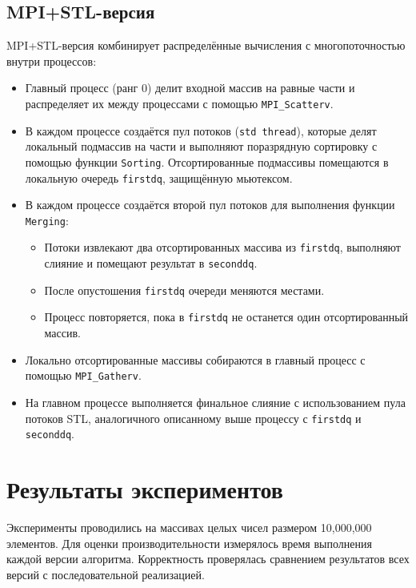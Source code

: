 \documentclass[a4paper,12pt]{article}
\begin{document}
\subsection{MPI+STL-версия}
MPI+STL-версия комбинирует распределённые вычисления с многопоточностью внутри процессов:
\begin{itemize}
    \item Главный процесс (ранг 0) делит входной массив на равные части и распределяет их между процессами с помощью \texttt{MPI_Scatterv}.
    \item В каждом процессе создаётся пул потоков (\texttt{std thread}), которые делят локальный подмассив на части и выполняют поразрядную сортировку с помощью функции \texttt{Sorting}. Отсортированные подмассивы помещаются в локальную очередь \texttt{firstdq}, защищённую мьютексом.
    \item В каждом процессе создаётся второй пул потоков для выполнения функции \texttt{Merging}:
        \begin{itemize}
            \item Потоки извлекают два отсортированных массива из \texttt{firstdq}, выполняют слияние и помещают результат в \texttt{seconddq}.
            \item После опустошения \texttt{firstdq} очереди меняются местами.
            \item Процесс повторяется, пока в \texttt{firstdq} не останется один отсортированный массив.
        \end{itemize}
    \item Локально отсортированные массивы собираются в главный процесс с помощью \texttt{MPI_Gatherv}.
    \item На главном процессе выполняется финальное слияние с использованием пула потоков STL, аналогичного описанному выше процессу с \texttt{firstdq} и \texttt{seconddq}.
\end{itemize}

\section{Результаты экспериментов}
Эксперименты проводились на массивах целых чисел размером 10,000,000 элементов. Для оценки производительности измерялось время выполнения каждой версии алгоритма. Корректность проверялась сравнением результатов всех версий с последовательной реализацией.
\end{document}
